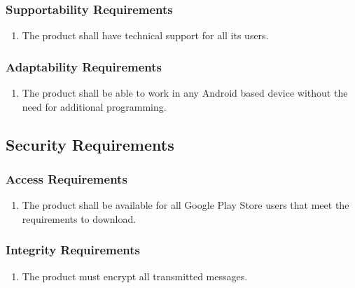 \documentclass[]{article}
\begin{document}
\subsubsection{Supportability Requirements}
\label{ssub:supportability_requirements}
\begin{enumerate}[{MS}2. ]
	\item The product shall have technical support for all its users.
\end{enumerate}

\subsubsection{Adaptability Requirements}
\label{ssub:adaptability_requirements}
\begin{enumerate}[{MS}3. ]
	\item The product shall be able to work in any Android based device without the need for additional programming.
\end{enumerate}


\subsection{Security Requirements}
\label{sub:security_requirements}

\subsubsection{Access Requirements}
\label{ssub:access_requirements}
\begin{enumerate}[{SR}1. ]
	\item The product shall be available for all Google Play Store users that meet the requirements to download.
\end{enumerate}

\subsubsection{Integrity Requirements}
\label{ssub:integrity_requirements}
\begin{enumerate}[{SR}2. ]
	\item The product must encrypt all transmitted messages.
\end{enumerate}
\end{document}
